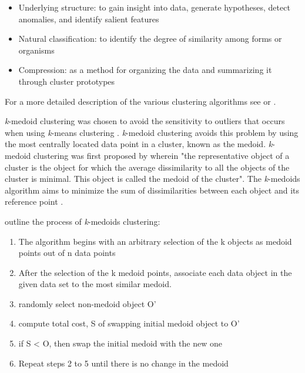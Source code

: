 \begin{itemize} 

\item Underlying structure: to gain insight into data, generate hypotheses, detect anomalies, and identify salient features  

\item Natural classification: to identify the degree of similarity among forms or organisms  

\item Compression: as a method for organizing the data and summarizing it through cluster prototypes  

\end{itemize}  

For a more detailed description of the various clustering algorithms see \citet{xu_comprehensive_2015} or \citet{ahmed_k-means_2020}.  

\textit{k}-medoid clustering was chosen to avoid the sensitivity to outliers that occurs when using \textit{k}-means clustering \citep{kaur_k-medoid_2014}. \textit{k}-medoid clustering avoids this problem by using the most centrally located data point in a cluster, known as the medoid. \textit{k}-medoid clustering was first proposed by \citet[1]{kaufman_clustering_1987} wherein "the representative object of a cluster is the object for which the average dissimilarity to all the objects of the cluster is minimal. This object is called the medoid of the cluster". The \textit{k}-medoids algorithm aims to minimize the sum of dissimilarities between each object and its reference point \citep{kaur_k-medoid_2014}.  




\citet[67]{wyld_comparison_2011} outline the process of \textit{k}-medoids clustering:  

\begin{enumerate} 

\item The algorithm begins with an arbitrary selection of the k objects as medoid points out of n data points  

\item After the selection of the k medoid points, associate each data object in the given data set to the most similar medoid.  

\item randomly select non-medoid object O' 

\item compute total cost, S of swapping initial medoid object to O' 

\item if S < O, then swap the initial medoid with the new one  

\item Repeat steps 2 to 5 until there is no change in the medoid  

\end{enumerate} 



